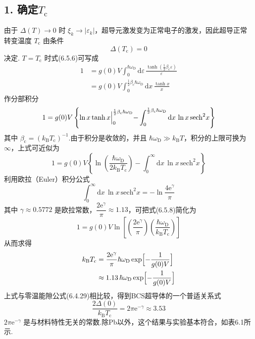 \subsection*{1. 确定$T_{\mathrm{c}}$}

由于 $\Delta(T)\to0$ 时 $\xi_{k}\to|\varepsilon_{k}|$，超导元激发变为正常电子的激发，因此超导正常转变温度 $T_{\mathrm{c}}$ 由条件
\begin{equation}
  \Delta(T_{\mathrm{c}})=0
\end{equation}
决定. $T=T_{\mathrm{c}}$ 时式(6.5.6)可写成
\begin{equation*}
\begin{aligned}
  1&=g(0)V\int_{0}^{\hbar\omega_{\mathrm{D}}}\mathrm{d}\varepsilon\,
  \frac{\tanh\left(\frac{1}{2}\beta_{\mathrm{c}}\varepsilon\right)}{\varepsilon}\\
  &=g(0)V\int_{0}^{\frac{1}{2}\beta_{\mathrm{c}}\hbar\omega_{\mathrm{D}}}
  \mathrm{d}x\,\frac{\tanh x}{x}
\end{aligned}
\end{equation*}
作分部积分
\begin{equation*}
  1=g(0)V\left\{\ln x\tanh x\Bigl|
  _{0}^{\frac{1}{2}\beta_{\mathrm{c}}\hbar\omega_{\mathrm{D}}}
  -\int_{0}^{\frac{1}{2}\beta_{\mathrm{c}}\hbar\omega_{\mathrm{D}}}
  \mathrm{d}x\,\ln x\,\mathrm{sech}^{2}x\right\}
\end{equation*}
其中 $\beta_{\mathrm{c}}=\left(k_{\mathrm{B}}T_{\mathrm{c}}\right)^{-1}$.由于积分是收敛的，并且 $\hbar\omega_{\mathrm{D}}\gg k_{\mathrm{B}}T$，积分的上限可换为 $\infty$，上式可近似为
\begin{equation}
  1=g(0)V\left\{\ln\left(\frac{\hbar\omega_{\mathrm{D}}}{2k_{\mathrm{B}}T_{\mathrm{c}}}\right)
  -\int_{0}^{\infty}\mathrm{d}x\,\ln x\,\mathrm{sech}^{2}x\right\}
\end{equation}
利用欧拉（Euler）积分公式
\begin{equation*}
  \int_{0}^{\infty}\mathrm{d}x\,\ln x\,\mathrm{sech}^{2}x
  =-\ln\frac{4\mathrm{e}^{\gamma}}{\pi}
\end{equation*}
其中 $\gamma\approx0.5772$ 是欧拉常数，$\dfrac{2\mathrm{e}^{\gamma}}{\pi}\approx1.13$，可把式(6.5.8)简化为
\begin{equation}
  1=g(0)V\ln\left[\left(\frac{2\mathrm{e}^{\gamma}}{\pi}\right)
  \left(\frac{\hbar\omega_{\mathrm{D}}}{k_{\mathrm{B}}T_{\mathrm{c}}}\right)\right]
\end{equation}
从而求得
\begin{equation}
\begin{aligned}
  k_{\mathrm{B}}T_{\mathrm{c}}&=\frac{2\mathrm{e}^{\gamma}}{\pi}
  \hbar\omega_{\mathrm{D}}\exp\Bigl[-\frac{1}{g(0)V}\Bigr]\\
  &\approx 1.13\,\hbar\omega_{\mathrm{D}}
  \exp\Bigl[-\frac{1}{g(0)V}\Bigr]
\end{aligned}
\end{equation}
上式与零温能隙公式(6.4.29)相比较，得到BCS超导体的一个普适关系式
\begin{equation}
  \frac{2\Delta(0)}{k_{\mathrm{B}}T_{\mathrm{c}}}=2\pi\mathrm{e}^{-\gamma}
  \approx 3.53
\end{equation}
$2\pi\mathrm{e}^{-\gamma}$ 是与材料特性无关的常数.除Pb以外，这个结果与实验基本符合，如表6.1所示.

